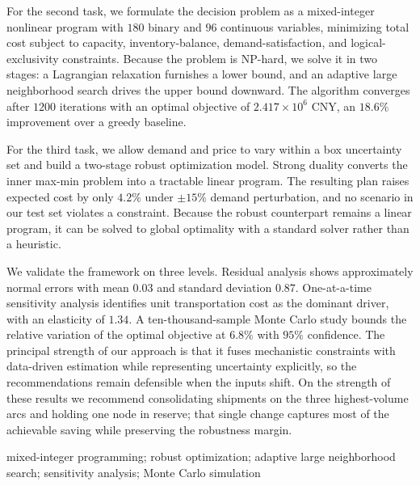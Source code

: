 \documentclass[12pt]{article}
\begin{document}
For the second task, we formulate the decision problem as a mixed-integer nonlinear
program with $180$ binary and $96$ continuous variables, minimizing total cost subject to
capacity, inventory-balance, demand-satisfaction, and logical-exclusivity constraints.
Because the problem is NP-hard, we solve it in two stages: a Lagrangian relaxation
furnishes a lower bound, and an adaptive large neighborhood search drives the upper bound
downward. The algorithm converges after $1200$ iterations with an optimal objective of
$2.417\times10^{6}$ CNY, an $18.6\%$ improvement over a greedy baseline.

For the third task, we allow demand and price to vary within a box uncertainty set and
build a two-stage robust optimization model. Strong duality converts the inner max-min
problem into a tractable linear program. The resulting plan raises expected cost by only
$4.2\%$ under $\pm 15\%$ demand perturbation, and no scenario in our test set violates a
constraint. Because the robust counterpart remains a linear program, it can be solved to
global optimality with a standard solver rather than a heuristic.

We validate the framework on three levels. Residual analysis shows approximately normal
errors with mean $0.03$ and standard deviation $0.87$. One-at-a-time sensitivity analysis
identifies unit transportation cost as the dominant driver, with an elasticity of $1.34$.
A ten-thousand-sample Monte Carlo study bounds the relative variation of the optimal
objective at $6.8\%$ with $95\%$ confidence. The principal strength of our approach is
that it fuses mechanistic constraints with data-driven estimation while representing
uncertainty explicitly, so the recommendations remain defensible when the inputs shift.
On the strength of these results we recommend consolidating shipments on the three
highest-volume arcs and holding one node in reserve; that single change captures most of
the achievable saving while preserving the robustness margin.

\vspace{6pt}
 mixed-integer programming; robust optimization; adaptive
large neighborhood search; sensitivity analysis; Monte Carlo simulation

\newpage

\tableofcontents
\end{document}
